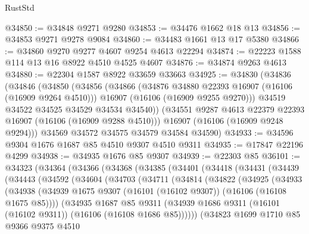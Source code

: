 \begin{lexlean}{RustStd}
\begin{coremodule}
@34850 := @34848 @9271 @9280
@34853 := @34476 @1662 @18 @13
@34856 := @34853 @9271 @9278 @9084
@34860 := @34483 @1661 @13 @17 @5380
@34866 := @34860 @9270 @9277 @4607 @9254 @4613 @22294
@34874 := @22223 @1588 @114 @13 @16 @8922 @4510 @4525 @4607
@34876 := @34874 @9263 @4613
@34880 := @22304 @1587 @8922 @33659 @33663
@34925 := @34830
    (@34836
      (@34846
        (@34850
          (@34856
            (@34866
              (@34876 @34880 @22393 @16907 (@16106 (@16909 @9264 @4510)))
              @16907
              (@16106 (@16909 @9255 @9270)))
            @34519
            @34522
            @34525
            @34529
            @34534
            @34540))
        (@34551 @9287 @4613 @22379 @22393 @16907 (@16106 (@16909 @9288 @4510)))
        @16907
        (@16106 (@16909 @9248 @9294)))
      @34569
      @34572
      @34575
      @34579
      @34584
      @34590)
@34933 := @34596 @9304 @1676 @1687 @85 @4510 @9307 @4510 @9311
@34935 := @17847 @22196 @4299
@34938 := @34935 @1676 @85 @9307
@34939 := @22303 @85
@36101 := @34323
    (@34364
      (@34366
        (@34368
          (@34385
            (@34401
              (@34418
                (@34431
                  (@34439
                    (@34443
                      (@34592
                        (@34604
                          (@34703
                            (@34711
                              (@34814
                                (@34822
                                  (@34925
                                    (@34933
                                      (@34938
                                        (@34939
                                          @1675
                                          @9307
                                          (@16101 (@16102 @9307))
                                          (@16106 (@16108 @1675 @85))))
                                      (@34935
                                        @1687
                                        @85
                                        @9311
                                        (@34939
                                          @1686
                                          @9311
                                          (@16101 (@16102 @9311))
                                          (@16106 (@16108 @1686 @85))))))
                                  (@34823
                                    @1699
                                    @1710
                                    @85
                                    @9366
                                    @9375
                                    @4510

\end{coremodule}
\end{lexlean}
